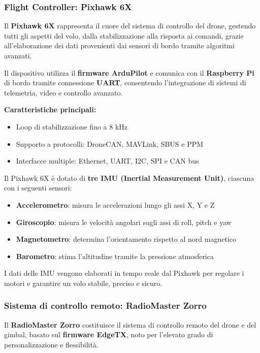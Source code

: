 \subsubsection{Flight Controller: Pixhawk 6X}

Il \textbf{Pixhawk 6X} \cite{px6} rappresenta il cuore del sistema di controllo del drone, gestendo tutti gli aspetti del volo, dalla stabilizzazione alla risposta ai comandi, grazie all’elaborazione dei dati provenienti dai sensori di bordo tramite algoritmi avanzati.  

Il dispositivo utilizza il \textbf{firmware ArduPilot}\cite{ardupilot} e comunica con il \textbf{Raspberry Pi} di bordo tramite connessione \textbf{UART}, consentendo l’integrazione di sistemi di telemetria, video e controllo avanzato.  

\textbf{Caratteristiche principali:}
\begin{itemize}
    \item Loop di stabilizzazione fino a 8 kHz
    \item Supporto a protocolli: DroneCAN, MAVLink, SBUS e PPM
    \item Interfacce multiple: Ethernet, UART, I2C, SPI e CAN bus
\end{itemize}

Il Pixhawk 6X è dotato di \textbf{tre IMU (Inertial Measurement Unit)}, ciascuna con i seguenti sensori:
\begin{itemize}
    \item \textbf{Accelerometro}: misura le accelerazioni lungo gli assi X, Y e Z
    \item \textbf{Giroscopio}: misura le velocità angolari sugli assi di roll, pitch e yaw
    \item \textbf{Magnetometro}: determina l’orientamento rispetto al nord magnetico
    \item \textbf{Barometro}: stima l’altitudine tramite la pressione atmosferica
\end{itemize}

I dati delle IMU vengono elaborati in tempo reale dal Pixhawk per regolare i motori e garantire un volo stabile, preciso e sicuro.

\subsubsection{Sistema di controllo remoto: RadioMaster Zorro}

Il \textbf{RadioMaster Zorro}\cite{radiomaster_zorro} costituisce il sistema di controllo remoto del drone e del gimbal, basato sul \textbf{firmware EdgeTX}, noto per l’elevato grado di personalizzazione e flessibilità.

